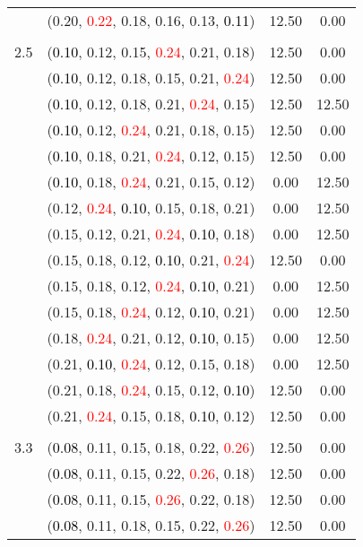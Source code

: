 \documentclass[10pt,a4paper]{report}
\begin{document}
\begin{center}
\begin{longtable}{clcc}
			&(0.20, \textcolor{red}{0.22}, 0.18, 0.16, 0.13, \textcolor{black}{0.11})&12.50&0.00\\
		&&&\\
		2.5			&(\textcolor{black}{0.10}, 0.12, 0.15, \textcolor{red}{0.24}, 0.21, 0.18)&12.50&0.00\\
			&(\textcolor{black}{0.10}, 0.12, 0.18, 0.15, 0.21, \textcolor{red}{0.24})&12.50&0.00\\
			&(\textcolor{black}{0.10}, 0.12, 0.18, 0.21, \textcolor{red}{0.24}, 0.15)&12.50&12.50\\
			&(\textcolor{black}{0.10}, 0.12, \textcolor{red}{0.24}, 0.21, 0.18, 0.15)&12.50&0.00\\
			&(\textcolor{black}{0.10}, 0.18, 0.21, \textcolor{red}{0.24}, 0.12, 0.15)&12.50&0.00\\
			&(\textcolor{black}{0.10}, 0.18, \textcolor{red}{0.24}, 0.21, 0.15, 0.12)&0.00&12.50\\
			&(0.12, \textcolor{red}{0.24}, \textcolor{black}{0.10}, 0.15, 0.18, 0.21)&0.00&12.50\\
			&(0.15, 0.12, 0.21, \textcolor{red}{0.24}, \textcolor{black}{0.10}, 0.18)&0.00&12.50\\
			&(0.15, 0.18, 0.12, \textcolor{black}{0.10}, 0.21, \textcolor{red}{0.24})&12.50&0.00\\
			&(0.15, 0.18, 0.12, \textcolor{red}{0.24}, \textcolor{black}{0.10}, 0.21)&0.00&12.50\\
			&(0.15, 0.18, \textcolor{red}{0.24}, 0.12, \textcolor{black}{0.10}, 0.21)&0.00&12.50\\
			&(0.18, \textcolor{red}{0.24}, 0.21, 0.12, \textcolor{black}{0.10}, 0.15)&0.00&12.50\\
			&(0.21, \textcolor{black}{0.10}, \textcolor{red}{0.24}, 0.12, 0.15, 0.18)&0.00&12.50\\
			&(0.21, 0.18, \textcolor{red}{0.24}, 0.15, 0.12, \textcolor{black}{0.10})&12.50&0.00\\
			&(0.21, \textcolor{red}{0.24}, 0.15, 0.18, \textcolor{black}{0.10}, 0.12)&12.50&0.00\\
		&&&\\
		3.3			&(\textcolor{black}{0.08}, 0.11, 0.15, 0.18, 0.22, \textcolor{red}{0.26})&12.50&0.00\\
			&(\textcolor{black}{0.08}, 0.11, 0.15, 0.22, \textcolor{red}{0.26}, 0.18)&12.50&0.00\\
			&(\textcolor{black}{0.08}, 0.11, 0.15, \textcolor{red}{0.26}, 0.22, 0.18)&12.50&0.00\\
			&(\textcolor{black}{0.08}, 0.11, 0.18, 0.15, 0.22, \textcolor{red}{0.26})&12.50&0.00\\

\end{longtable}
\end{center}
\end{document}
